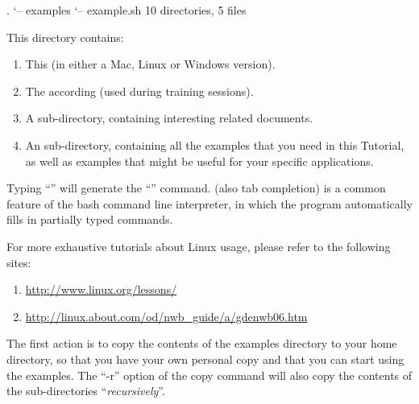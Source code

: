 \begin{prompt}
.
`-- examples
    `-- example.sh
10 directories, 5 files
\end{prompt}

This directory contains:

\begin{enumerate}
  \item This  (in either a Mac, Linux or Windows version).
  \item The according  (used during training sessions).
  \item A  sub-directory, containing interesting \hpc related documents.
  \item An  sub-directory, containing all the
    examples that you need in this Tutorial, as well as examples that might be
    useful for your specific applications.
\end{enumerate}

\begin{prompt}
\end{prompt}

Typing ``'' will generate the
``'' command. (also tab completion) is a common feature of the bash command line
interpreter, in which the program automatically fills in partially typed
commands.

 For more exhaustive tutorials about Linux usage,
please refer to the following sites:

\begin{enumerate}
  \item \url{http://www.linux.org/lessons/}
  \item \url{http://linux.about.com/od/nwb\_guide/a/gdenwb06.htm}
\end{enumerate}

The first action is to copy the contents of the \hpc examples directory 
to your home directory, so that you have your own personal copy and that 
you can start using the examples. The ``-r'' option of the copy command 
will also copy the contents of the sub-directories ``\emph{recursively}''.  

